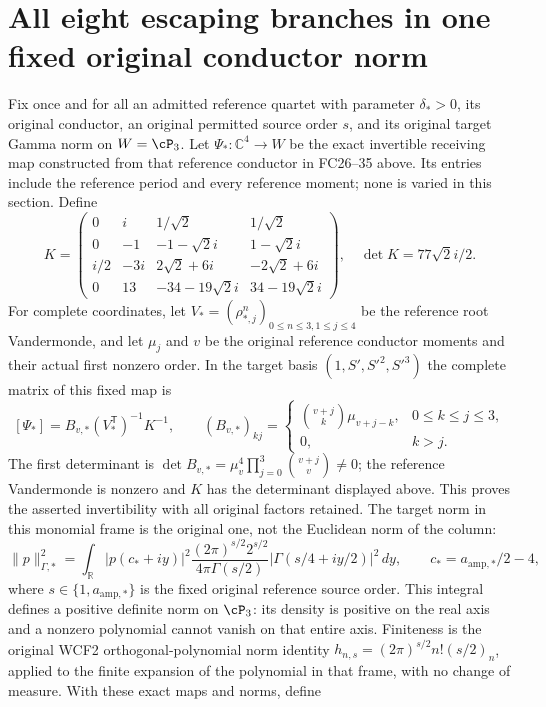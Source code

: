 \documentclass[11pt]{article}
\newcommand{\C}{\mathbb C}
\begin{document}
\section{All eight escaping branches in one fixed original conductor norm}
Fix once and for all an admitted reference quartet with parameter
$\delta_*>0$, its original conductor, an original permitted source
order $s$, and its original target Gamma norm on $W=\cP_3$.
Let $\Psi_*:\C^4\to W$ be the exact invertible receiving map
constructed from that reference conductor in FC26--35
above. Its entries include the reference period and every
reference moment; none is varied in this section. Define
\[
 K=\begin{pmatrix}
 0&i&1/\sqrt2&1/\sqrt2\\
 0&-1&-1-\sqrt2 i&1-\sqrt2 i\\
 i/2&-3i&2\sqrt2+6i&-2\sqrt2+6i\\
 0&13&-34-19\sqrt2 i&34-19\sqrt2 i
 \end{pmatrix},\quad \det K=77\sqrt2 i/2.
\]
For complete coordinates, let $V_*=(\rho_{*,j}^n)_{0\le n\le3,1\le j\le4}$
be the reference root Vandermonde, and let $\mu_j$ and $v$ be
the original reference conductor moments and their actual first
nonzero order. In the target basis $(1,S',S'^2,S'^3)$ the complete
matrix of this fixed map is
\[
 [\Psi_*]=B_{v,*}(V_*^{\mathsf T})^{-1}K^{-1},\qquad
 (B_{v,*})_{kj}=\begin{cases}
 \binom{v+j}{k}\mu_{v+j-k},&0\le k\le j\le3,\\
 0,&k>j.
 \end{cases}
\]
The first determinant is
$\det B_{v,*}=\mu_v^4\prod_{j=0}^3\binom{v+j}{v}\ne0$;
the reference Vandermonde is nonzero and $K$ has the determinant
displayed above. This proves the asserted invertibility with all
original factors retained. The target norm in this monomial frame
is the original one, not the Euclidean norm of the column:
\[
 \|p\|_{\Gamma,*}^2=
 \int_{\mathbb R}|p(c_*+iy)|^2
 \frac{(2\pi)^{s/2}2^{s/2}}{4\pi\Gamma(s/2)}
 |\Gamma(s/4+iy/2)|^2\,dy,\qquad
 c_*=a_{\mathrm{amp},*}/2-4,
\]
where $s\in\{1,a_{\mathrm{amp},*}\}$ is the fixed original
reference source order. This integral defines a positive definite
norm on $\cP_3$: its density is positive on the real axis and a
nonzero polynomial cannot vanish on that entire axis. Finiteness is
the original WCF2 orthogonal-polynomial norm identity
$h_{n,s}=(2\pi)^{s/2}n!(s/2)_n$, applied to the finite expansion
of the polynomial in that frame, with no change of measure.
With these exact maps and norms, define
\end{document}
